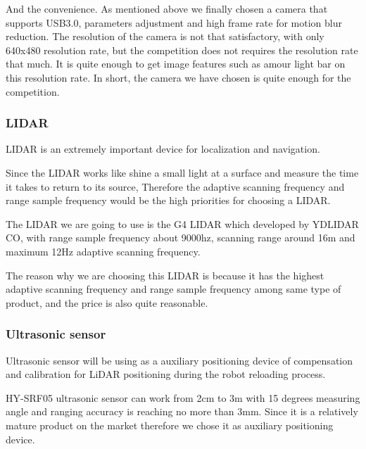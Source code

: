 And the convenience.
As mentioned above we finally chosen a camera that supports USB3.0, parameters adjustment and high frame rate for motion blur reduction.
The resolution of the camera is not that satisfactory, with only 640x480 resolution rate, but the competition does not requires the resolution rate that much.
It is quite enough to get image features such as amour light bar on this resolution rate. In short, the camera we have chosen is quite enough for the competition.

\subsubsection{LIDAR}

LIDAR is an extremely important device for localization and navigation.

Since the LIDAR works like shine a small light at a surface and measure the time it takes to return to its source, Therefore the adaptive scanning frequency and range sample frequency would be the high priorities for choosing a LIDAR.

The LIDAR we are going to use is the G4 LIDAR which developed by YDLIDAR CO, with range sample frequency about 9000hz, scanning range around 16m and maximum 12Hz adaptive scanning frequency.

The reason why we are choosing this LIDAR is because it has the highest adaptive scanning frequency and range sample frequency among same type of product, and the price is also quite reasonable. 

\subsubsection{Ultrasonic sensor}

Ultrasonic sensor will be using as a auxiliary positioning device of compensation and calibration for LiDAR positioning during the robot reloading process.

HY-SRF05 ultrasonic sensor can work from 2cm to 3m with 15 degrees measuring angle and ranging accuracy is reaching no more than 3mm.
Since it is a relatively mature product on the market therefore we chose it as auxiliary positioning device.

\pagebreak